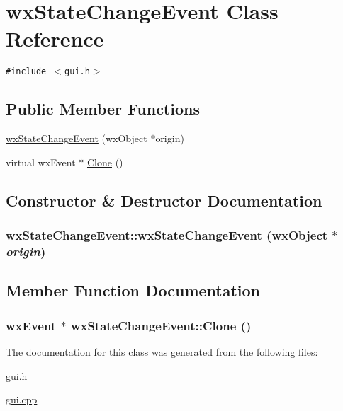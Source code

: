 \hypertarget{classwxStateChangeEvent}{
\section{wxStateChangeEvent Class Reference}
\label{classwxStateChangeEvent}
}
{\tt \#include $<$gui.h$>$}

\subsection*{Public Member Functions}
\begin{CompactItemize}
\item 
\hyperlink{classwxStateChangeEvent_dee1018c458a03a33ee5b4fedc12c9a0}{wxStateChangeEvent} (wxObject $\ast$origin)
\item 
virtual wxEvent $\ast$ \hyperlink{classwxStateChangeEvent_92d5b5b4e174eeb2532cd44711ee4c3a}{Clone} ()
\end{CompactItemize}


\subsection{Constructor \& Destructor Documentation}
\hypertarget{classwxStateChangeEvent_dee1018c458a03a33ee5b4fedc12c9a0}{
\subsubsection[{wxStateChangeEvent}]{\setlength{\rightskip}{0pt plus 5cm}wxStateChangeEvent::wxStateChangeEvent (wxObject $\ast$ {\em origin})}}
\label{classwxStateChangeEvent_dee1018c458a03a33ee5b4fedc12c9a0}




\subsection{Member Function Documentation}
\hypertarget{classwxStateChangeEvent_92d5b5b4e174eeb2532cd44711ee4c3a}{
\subsubsection[{Clone}]{\setlength{\rightskip}{0pt plus 5cm}wxEvent $\ast$ wxStateChangeEvent::Clone ()}}
\label{classwxStateChangeEvent_92d5b5b4e174eeb2532cd44711ee4c3a}




The documentation for this class was generated from the following files:\begin{CompactItemize}
\item 
\hyperlink{gui_8h}{gui.h}\item 
\hyperlink{gui_8cpp}{gui.cpp}\end{CompactItemize}
